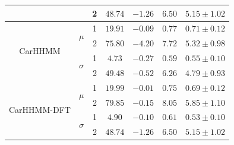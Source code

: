 \documentclass[12pt]{TD-CJS}
\begin{document}
\begin{table}
{\begin{tabular}{ccccccc}
                           &                               & 2                             & $48.74$                         & $-1.26$                     & $6.50$                             & $5.15 \pm 1.02$                             \\ \hline
\multirow{4}{*}{CarHHMM}   & \multirow{2}{*}{$\mu$}        & 1                             & $19.91$                         & $-0.09$                     & $0.77$                             & $0.71 \pm 0.12$                             \\
                           &                               & 2                             & $75.80$                         & $-4.20$                     & $7.72$                             & $5.32 \pm 0.98$                             \\
                           & \multirow{2}{*}{$\sigma$}     & 1                             & $4.73$                         & $-0.27$                     & $0.59$                             & $0.55 \pm 0.10$                             \\
                           &                               & 2                             & $49.48$                         & $-0.52$                     & $6.26$                             & $4.79 \pm 0.93$                             \\ \hline
\multirow{4}{*}{CarHHMM-DFT}& \multirow{2}{*}{$\mu$}        & 1                             & $19.99$                         & $-0.01$                     & $0.75$                             & $0.69 \pm 0.12$                             \\
                           &                               & 2                             & $79.85$                         & $-0.15$                     & $8.05$                             & $5.85 \pm 1.10$                             \\
                           & \multirow{2}{*}{$\sigma$}     & 1                             & $4.90$                         & $-0.10$                     & $0.61$                             & $0.53 \pm 0.10$                             \\
                           &                               & 2                             & $48.74$                         & $-1.26$                     & $6.50$                             & $5.15 \pm 1.02$                             
\end{tabular}
}
\label{table:dive_duration}
\end{table}
\end{document}

